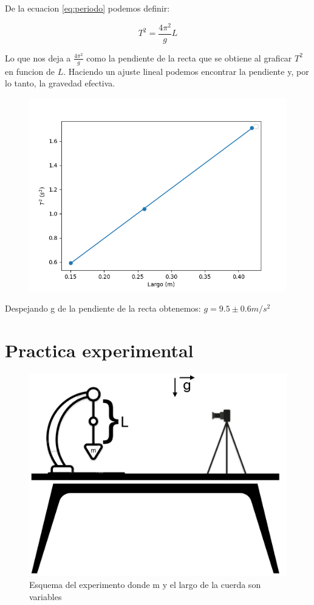 \documentclass[12pt,a4]{article}
\begin{document}
De la ecuacion \ref{eq:periodo} podemos definir:

\begin{equation}
    T^2 = \frac{4 \pi^2}{g} L
    \label{eq:gravedad}
\end{equation}

Lo que nos deja a $\frac{4 \pi^2}{g}$ como la pendiente de la recta que se obtiene al graficar $T^2$ en funcion de $L$. Haciendo un ajuste lineal podemos encontrar la pendiente y, por lo tanto, la gravedad efectiva.

\begin{figure}[H]
    \centering
    \includegraphics[width=0.6\linewidth]{gravedad.png}
    \caption{}   
    \label{fig:gravedad}
\end{figure}

Despejando g de la pendiente de la recta obtenemos: $g = 9.5 \pm 0.6 m/s^2$

\section{Practica experimental}

\begin{figure}[H]
    \centering
    \includegraphics[width=0.6\linewidth]{esquema.png}
    \caption{Esquema del experimento donde m y el largo de la cuerda son variables}   
    \label{fig:esquema}
\end{figure}
\end{document}
